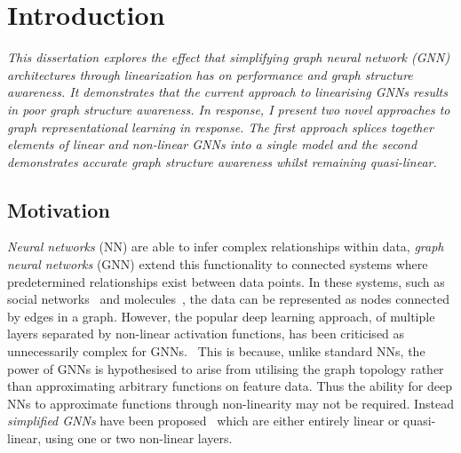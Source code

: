 \chapter{Introduction}


\emph{
    This dissertation explores the effect that simplifying graph neural network (GNN) architectures through linearization has on performance and graph structure awareness.
    It demonstrates that the current approach to linearising GNNs results in poor graph structure awareness. In response, I present two novel approaches to graph representational learning in response.
    The first approach splices together elements of linear and non-linear GNNs into a single model and the second demonstrates accurate graph structure awareness whilst remaining quasi-linear.
}

\section{Motivation}
\label{sec:motivation}




\emph{Neural networks} (NN) are able to infer complex relationships within data, \emph{graph neural networks} (GNN) extend this functionality to connected systems where predetermined relationships exist between data points.
In these systems, such as social networks~\cite{pmlr-v70-gilmer17a} and molecules~\cite{DBLP:journals/corr/abs-1806-01973}, the data can be represented as nodes connected by edges in a graph.
However, the popular deep learning approach, of multiple layers separated by non-linear activation functions, has been criticised as unnecessarily complex for GNNs.~\cite{wu2019simplifying}
This is because, unlike standard NNs, the power of GNNs is hypothesised to arise from utilising the graph topology rather than approximating arbitrary functions on feature data.
Thus the ability for deep NNs to approximate functions through non-linearity may not be required.
Instead \emph{simplified GNNs} have been proposed~\cite{chanpuriya2022simplified,chien2020adaptive,wu2019simplifying} which are either entirely linear or quasi-linear, using one or two non-linear layers.

